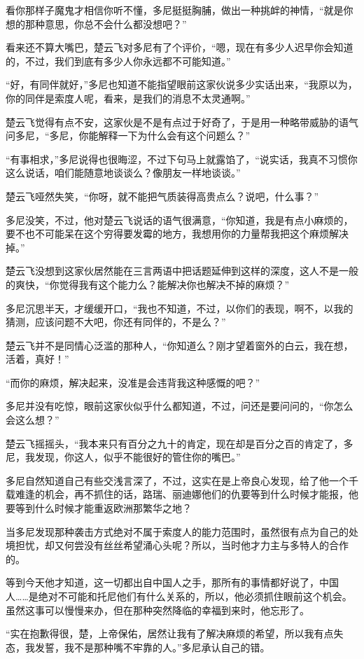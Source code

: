 看你那样子魔鬼才相信你听不懂，多尼挺挺胸脯，做出一种挑衅的神情，“就是你想的那种意思，你总不会什么都没想吧？”

看来还不算大嘴巴，楚云飞对多尼有了个评价，“嗯，现在有多少人迟早你会知道的，不过，我们到底有多少人你永远都不可能知道。”

“好，有同伴就好，”多尼也知道不能指望眼前这家伙说多少实话出来，“我原以为，你的同伴是索度人呢，看来，是我们的消息不太灵通啊。”

楚云飞觉得有点不安，这家伙是不是有点过于好奇了，于是用一种略带威胁的语气问多尼，“多尼，你能解释一下为什么会有这个问题么？”

“有事相求，”多尼说得也很晦涩，不过下句马上就露馅了，“说实话，我真不习惯你这么说话，咱们能随意地谈谈么？像朋友一样地谈谈。”

楚云飞哑然失笑，“你呀，就不能把气质装得高贵点么？说吧，什么事？”

多尼没笑，不过，他对楚云飞说话的语气很满意，“你知道，我是有点小麻烦的，要不也不可能呆在这个穷得要发霉的地方，我想用你的力量帮我把这个麻烦解决掉。”

楚云飞没想到这家伙居然能在三言两语中把话题延伸到这样的深度，这人不是一般的爽快，“你觉得我有这个能力么？能解决你也解决不掉的麻烦？”

多尼沉思半天，才缓缓开口，“我也不知道，不过，以你们的表现，啊不，以我的猜测，应该问题不大吧，你还有同伴的，不是么？”

楚云飞并不是同情心泛滥的那种人，“你知道么？刚才望着窗外的白云，我在想，活着，真好！”

“而你的麻烦，解决起来，没准是会违背我这种感慨的吧？”

多尼并没有吃惊，眼前这家伙似乎什么都知道，不过，问还是要问问的，“你怎么会这么想？”

楚云飞摇摇头，“我本来只有百分之九十的肯定，现在却是百分之百的肯定了，多尼，我发现，你这人，似乎不能很好的管住你的嘴巴。”

多尼自然知道自己有些交浅言深了，不过，这实在是上帝良心发现，给了他一个千载难逢的机会，再不抓住的话，路瑞、丽迪娜他们的仇要等到什么时候才能报，他要等到什么时候才能重返欧洲那繁华之地？

当多尼发现那种袭击方式绝对不属于索度人的能力范围时，虽然很有点为自己的处境担忧，却又何尝没有丝丝希望涌心头呢？所以，当时他才力主与多特人的合作的。

等到今天他才知道，这一切都出自中国人之手，那所有的事情都好说了，中国人……是绝对不可能和托尼他们有什么关系的，所以，他必须抓住眼前这个机会。虽然这事可以慢慢来办，但在那种突然降临的幸福到来时，他忘形了。

“实在抱歉得很，楚，上帝保佑，居然让我有了解决麻烦的希望，所以我有点失态，我发誓，我不是那种嘴不牢靠的人。”多尼承认自己的错。

